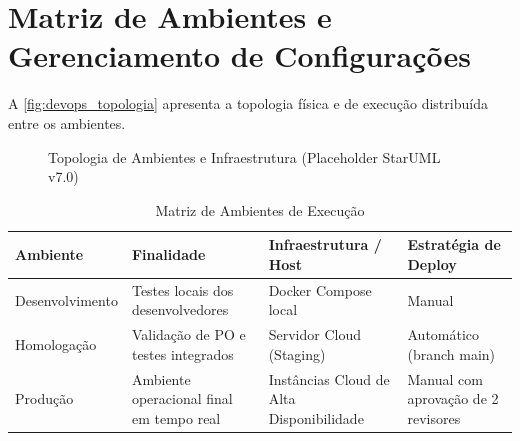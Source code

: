 \section{Matriz de Ambientes e Gerenciamento de Configurações}
A \autoref{fig:devops_topologia} apresenta a topologia física e de execução distribuída entre os ambientes.

\begin{figure}[htbp]
    \centering
    \caption{Topologia de Ambientes e Infraestrutura (Placeholder StarUML v7.0)}
    \label{fig:devops_topologia}
\end{figure}

\begin{table}[htbp]
\caption{Matriz de Ambientes de Execução}
\label{tab:matriz_ambientes}
\centering
\small
\begin{tabularx}{\textwidth}{@{} l Y Y Y @{}}
\toprule
\textbf{Ambiente} & \textbf{Finalidade} & \textbf{Infraestrutura / Host} & \textbf{Estratégia de Deploy} \\
\midrule
Desenvolvimento & Testes locais dos desenvolvedores & Docker Compose local & Manual \\
Homologação & Validação de PO e testes integrados & Servidor Cloud (Staging) & Automático (branch main) \\
Produção & Ambiente operacional final em tempo real & Instâncias Cloud de Alta Disponibilidade & Manual com aprovação de 2 revisores \\
\bottomrule
\end{tabularx}
\end{table}

